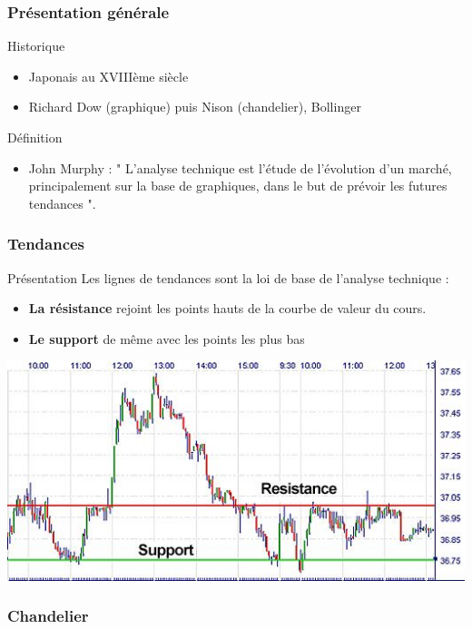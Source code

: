 \begin{frame}
    \frametitle{Présentation générale}
  	\begin{block}{Historique}
  	\begin{itemize}
  		\item Japonais au XVIIIème siècle
  		\item Richard Dow (graphique) puis Nison (chandelier), Bollinger
	\end{itemize}
	
	\end{block}
	\pause
	\begin{block}{Définition}
		\begin{itemize}
			\item John Murphy : " L’analyse technique est l’étude de l’évolution d’un marché, principalement sur la base de graphiques, dans le but de prévoir les futures tendances ".
		\end{itemize}
	\end{block}
\end{frame}

\begin{frame}
    \frametitle{Tendances}
  	\begin{block}{Présentation}
  		Les lignes de tendances sont la loi de base de l’analyse technique :
  		\begin{itemize}
  			\item \textbf{La résistance} rejoint les points hauts de la courbe de valeur du cours.
  			\item \textbf{Le support} de même avec les points les plus bas
  		\end{itemize}
  		\center
  	\includegraphics[scale=0.3]{images/supportresistance.jpg}

	\end{block}
\end{frame}

\begin{frame}
    \frametitle{Chandelier}
  

\end{frame}

